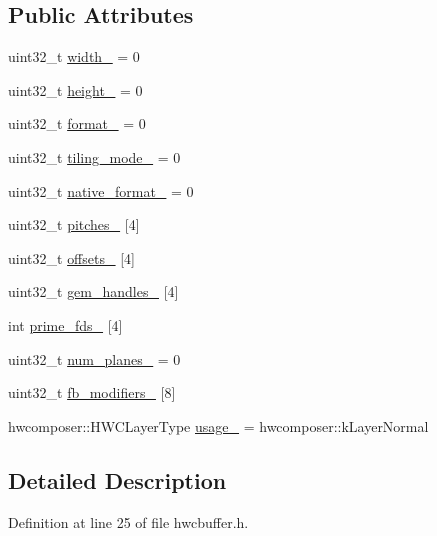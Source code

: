 \subsection*{Public Attributes}
\begin{DoxyCompactItemize}
\item 
uint32\+\_\+t \mbox{\hyperlink{structHwcBuffer_a30619ecf0d453e5f26717b4faa62a0ef}{width\+\_\+}} = 0
\item 
uint32\+\_\+t \mbox{\hyperlink{structHwcBuffer_a0cdc2e30a285f500ebf3da7390b68d6a}{height\+\_\+}} = 0
\item 
uint32\+\_\+t \mbox{\hyperlink{structHwcBuffer_ae37e601e5fe0b02095f6f8426657001c}{format\+\_\+}} = 0
\item 
uint32\+\_\+t \mbox{\hyperlink{structHwcBuffer_ad054bfc2a178522d502d612ee45f4ac7}{tiling\+\_\+mode\+\_\+}} = 0
\item 
uint32\+\_\+t \mbox{\hyperlink{structHwcBuffer_a3e1efcaa23962cbabcef343aeb6a7c4e}{native\+\_\+format\+\_\+}} = 0
\item 
uint32\+\_\+t \mbox{\hyperlink{structHwcBuffer_ac387888cb4382f70e7f498a964ca7ce5}{pitches\+\_\+}} \mbox{[}4\mbox{]}
\item 
uint32\+\_\+t \mbox{\hyperlink{structHwcBuffer_acc511f1aa09a69ae1d9ee9d948730f5e}{offsets\+\_\+}} \mbox{[}4\mbox{]}
\item 
uint32\+\_\+t \mbox{\hyperlink{structHwcBuffer_a0454a1651446654d1a863e844af23759}{gem\+\_\+handles\+\_\+}} \mbox{[}4\mbox{]}
\item 
int \mbox{\hyperlink{structHwcBuffer_a51f659d550dae6ea7b6208019cc08169}{prime\+\_\+fds\+\_\+}} \mbox{[}4\mbox{]}
\item 
uint32\+\_\+t \mbox{\hyperlink{structHwcBuffer_ab48df5577e8ecd60f18b4b5e6ec6544d}{num\+\_\+planes\+\_\+}} = 0
\item 
uint32\+\_\+t \mbox{\hyperlink{structHwcBuffer_ad16028811f8af57430b65129bf7ae67a}{fb\+\_\+modifiers\+\_\+}} \mbox{[}8\mbox{]}
\item 
hwcomposer\+::\+H\+W\+C\+Layer\+Type \mbox{\hyperlink{structHwcBuffer_aa3db6171195a29eb453006b3d5e5c5d9}{usage\+\_\+}} = hwcomposer\+::k\+Layer\+Normal
\end{DoxyCompactItemize}


\subsection{Detailed Description}


Definition at line 25 of file hwcbuffer.\+h.



